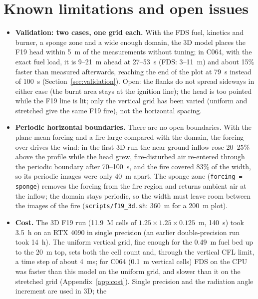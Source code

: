 \documentclass[11pt,a4paper]{article}
\newcommand{\code}[1]{\texttt{#1}}
\begin{document}
\section{Known limitations and open issues}\label{sec:limitations}
\begin{itemize}
  \item \textbf{Validation: two cases, one grid each.} With the FDS fuel, kinetics and burner, a sponge zone and
        a wide enough domain, the 3D model places the F19 head within 5~m of the measurements without tuning;
        in C064, with the exact fuel load, it is 9--21~m ahead at 27--53~s (FDS: 3--11~m) and about 15\% faster
        than measured afterwards, reaching the end of the plot at 79~s instead of 100~s
        (Section~\ref{sec:validation}). Open: the flanks do not spread sideways in either case (the burnt
        area stays at the ignition line); the head is too pointed while the F19 line is lit; only the
        vertical grid has been varied (uniform and stretched give the same F19 fire), not the horizontal
        spacing.
  \item \textbf{Periodic horizontal boundaries.} There are no open boundaries. With the plane-mean
        forcing and a fire large compared with the domain, the forcing over-drives the wind: in the first 3D
        run the near-ground inflow rose 20--25\% above the profile while the head grew, fire-disturbed air
        re-entered through the periodic boundary after 70--100~s, and the fire covered 83\% of the width, so
        its periodic images were only 40~m apart. The sponge zone (\code{forcing = sponge}) removes the
        forcing from the fire region and returns ambient air at the inflow; the domain stays periodic, so
        the width must leave room between the images of the fire (\code{scripts/f19\_3d.sh}: 360~m for a
        200~m plot).
  \item \textbf{Cost.} The 3D F19 run (11.9~M cells of $1.25\times1.25\times0.125$~m, 140~s) took 3.5~h on an RTX
        4090 in single precision (an earlier double-precision run took 14~h). The uniform vertical grid, fine
        enough for the 0.49~m fuel bed up to the 20~m top, sets both the cell count and, through the vertical
        CFL limit, a time step of about 4~ms; for C064 (0.1~m vertical cells) FDS on the CPU was faster than this model
        on the uniform grid, and slower than it on the stretched grid (Appendix~\ref{app:cost}). Single precision and the radiation angle increment are used in 3D; the

\end{itemize}
\end{document}
